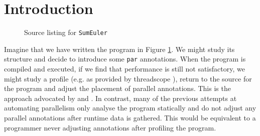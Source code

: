 %
%
%

%
%
%

\section{Introduction}
\label{section:Introduction}



\begin{figure}
  
\caption{Source listing for \texttt{SumEuler}}
\label{sumOrig}
\end{figure}

Imagine that we have written the program in Figure \ref{sumOrig}. We might
study its structure and decide to introduce some \verb-par- annotations.  When
the program is compiled and executed, if we find that performance is still not
satisfactory, we might study a profile (e.g. as provided by threadscope
\citep{Jones2009Tuning}), return to the source for the program and adjust the
placement of parallel annotations. This is the approach advocated by
\citep{Jones2009Tuning} and \citep{runciman1994profiling}.  In contrast, many of
the previous attempts at automating parallelism only analyse the program
statically and do not adjust any parallel annotations after runtime data is
gathered. This would be equivalent to a programmer never adjusting annotations
after profiling the program.

